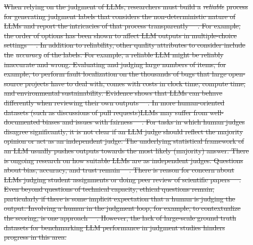 \documentclass[smallextended]{svjour3}
\newcommand{\studytypeparagraph}[1]{\paragraph{\bfseries #1:}}
\providecommand{\DIFdeltex}[1]{{\protect\color{red}\sout{#1}}}                      %
\providecommand{\DIFdelbegin}{} %
\providecommand{\DIFdel}[1]{\texorpdfstring{\DIFdeltex{#1}}{}} %
\newcommand{\DIFscaledelfig}{0.5}
\newlength{\DIFdelgraphicswidth} %
\newlength{\DIFdelgraphicsheight} %
\newcommand{\DIFdelincludegraphics}[2][]{%
\sbox{\DIFdelgraphicsbox}{\DIFOincludegraphics[#1]{#2}}%
\settoboxwidth{\DIFdelgraphicswidth}{\DIFdelgraphicsbox} %
\settoboxtotalheight{\DIFdelgraphicsheight}{\DIFdelgraphicsbox} %
\scalebox{\DIFscaledelfig}{%
\parbox[b]{\DIFdelgraphicswidth}{\usebox{\DIFdelgraphicsbox}\\[-\baselineskip] \rule{\DIFdelgraphicswidth}{0em}}\llap{\resizebox{\DIFdelgraphicswidth}{\DIFdelgraphicsheight}{%
\setlength{\unitlength}{\DIFdelgraphicswidth}%
\begin{picture}(1,1)%
\thicklines\linethickness{2pt} %
{\color[rgb]{1,0,0}\put(0,0){\framebox(1,1){}}}%
{\color[rgb]{1,0,0}\put(0,0){\line( 1,1){1}}}%
{\color[rgb]{1,0,0}\put(0,1){\line(1,-1){1}}}%
\end{picture}%
}\hspace*{3pt}}} %
} %
\DeclareRobustCommand{\DIFdelbegin}{\DIFOdelbegin \let\includegraphics\DIFdelincludegraphics} %
\begin{document}
\DIFdelbegin %

\DIFdel{When relying on the judgment of LLMs, researchers must build a }\textit{\DIFdel{reliable}} %
\DIFdel{process for generating judgment labels that considers the non-de\-ter\-min\-is\-tic nature of LLMs and report the intricacies of that process transparently~\mbox{%
\cite{DBLP:journals/corr/abs-2412-12509}}\hskip0pt%
.
For example, the order of options has been shown to affect LLM outputs in multiple-choice settings~\mbox{%
\cite{DBLP:conf/naacl/PezeshkpourH24}}\hskip0pt%
. 
In addition to reliability, other quality attributes to consider include the }\textit{\DIFdel{accuracy}} %
\DIFdel{of the labels. For example, a reliable LLM might be reliably inaccurate and wrong. 
Evaluating and judging large numbers of items, for example, to perform fault localization on the thousands of bugs that large open-source projects have to deal with, comes with costs in clock time, compute time, and environmental sustainability.
Evidence shows that LLMs can behave differently when reviewing their own outputs~\mbox{%
\cite{NEURIPS2024_7f1f0218}}\hskip0pt%
.
In more human-oriented datasets (such as discussions of pull requests)LLMs may suffer from well-documented biases and issues with fairness~\mbox{%
\cite{Gallegos2024BiasAF}}\hskip0pt%
. 
For tasks in which human judges disagree significantly, it is not clear if an LLM judge should reflect the majority opinion or act as an independent judge.
The underlying statistical framework of an LLM usually pushes outputs towards the most likely (majority) answer. 
There is ongoing research on how suitable LLMs are as independent judges.
Questions about bias, accuracy, and trust remain~\mbox{%
\cite{DBLP:journals/corr/abs-2406-18403}}\hskip0pt%
.
There is reason for concern about LLMs judging student assignments or doing peer review of scientific papers~\mbox{%
\cite{DBLP:conf/coling/ZhouC024}}\hskip0pt%
.
Even beyond questions of technical capacity, ethical questions remain, particularly if there is some implicit expectation that a human is judging the output.
Involving a human in the judgment loop, for example, to contextualize the scoring, is one approach~\mbox{%
\cite{panHumanCenteredDesignRecommendations2024}}\hskip0pt%
. 
However, the lack of large-scale ground truth datasets for benchmarking LLM performance in judgment studies hinders progress in this area.
 }%
\end{document}
